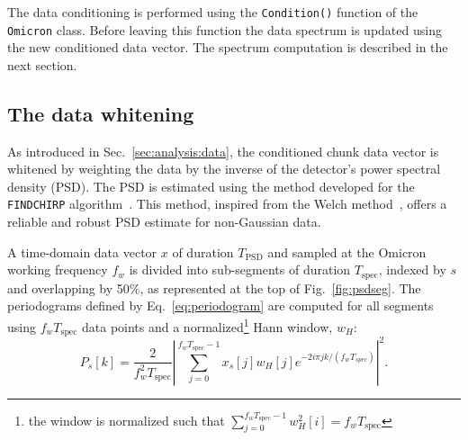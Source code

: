 The data conditioning is performed using the \texttt{Condition()} function of the \texttt{Omicron} class. Before leaving this function the data spectrum is updated using the new conditioned data vector. The spectrum computation is described in the next section. 


\subsection{The data whitening} \label{sec:algorithm:whitening}

As introduced in Sec.~\ref{sec:analysis:data}, the conditioned chunk data vector is whitened by weighting the data by the inverse of the detector's power spectral density (PSD). The PSD is estimated using the method developed for the \texttt{FINDCHIRP} algorithm~\cite{Allen:2005fk}. This method, inspired from the Welch method~\cite{Welch:1967}, offers a reliable and robust PSD estimate for non-Gaussian data.

A time-domain data vector $x$ of duration $T_\mathrm{PSD}$ and sampled at the Omicron working frequency $f_w$ is divided into sub-segments of duration $T_\mathrm{spec}$, indexed by $s$ and overlapping by 50\%, as represented at the top of Fig.~\ref{fig:psdseg}. The periodograms defined by Eq.~\ref{eq:periodogram} are computed for all segments using $f_wT_\mathrm{spec}$ data points and a normalized\footnote{the window is normalized such that $\sum_{j=0}^{f_wT_\mathrm{spec}-1}{w_H^2[i]} = f_wT_\mathrm{spec}$} Hann window, $w_H$:
\begin{equation}
  P_s[k] = \frac{2}{f_w^2T_\mathrm{spec}}\left|\sum_{j=0}^{f_wT_\mathrm{spec}-1}{x_s[j]w_H[j]e^{-2i\pi jk/(f_wT_{spec})}}\right|^2.
\end{equation}

